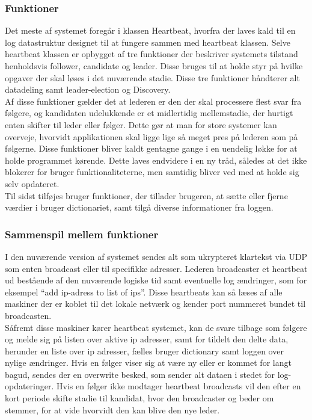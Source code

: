 \documentclass[a4paper,12pt]{article}
\begin{document}
\subsubsection{Funktioner} 
Det meste af systemet foregår i klassen Heartbeat, hvorfra der laves kald til en log datastruktur designet til at fungere sammen med heartbeat klassen. Selve heartbeat klassen er opbygget af tre funktioner der beskriver systemets tilstand henholdsvis follower, candidate og leader. Disse bruges til at holde styr på hvilke opgaver der skal løses i det nuværende stadie. Disse tre funktioner håndterer alt datadeling samt leader-election og Discovery.
\\[5px]
Af disse funktioner gælder det at lederen er den der skal processere flest svar fra følgere, og kandidaten udelukkende er et midlertidig mellemstadie, der hurtigt enten skifter til leder eller følger. Dette gør at man for store systemer kan overveje, hvorvidt applikationen skal ligge lige så meget pres på lederen som på følgerne.
Disse funktioner bliver kaldt gentagne gange i en uendelig løkke for at holde programmet kørende. Dette laves endvidere i en ny tråd, således at det ikke blokerer for bruger funktionaliteterne, men samtidig bliver ved med at holde sig selv opdateret.
\\
Til sidst tilføjes bruger funktioner, der tillader brugeren, at sætte eller fjerne værdier i bruger dictionariet, samt tilgå diverse informationer fra loggen.

\subsubsection{Sammenspil mellem funktioner}
I den nuværende version af systemet sendes alt som ukrypteret klartekst via UDP som enten broadcast eller til specifikke adresser. Lederen broadcaster et heartbeat ud bestående af den nuværende logiske tid samt eventuelle log ændringer, som for eksempel “add ip-adress to list of ips”.  Disse heartbeats kan så læses af alle maskiner der er koblet til det lokale netværk og kender port nummeret bundet til broadcasten. 
\\
Såfremt disse maskiner kører heartbeat systemet, kan de svare tilbage som følgere og melde sig på listen over aktive ip adresser, samt for tildelt den delte data, herunder en liste over ip adresser, fælles bruger dictionary samt loggen over nylige ændringer. Hvis en følger viser sig at være ny eller er kommet for langt bagud, sendes der en overwrite besked, som sender alt dataen i stedet for log-opdateringer. Hvis en følger ikke modtager heartbeat broadcasts vil den efter en kort periode skifte stadie til kandidat, hvor den broadcaster og beder om stemmer, for at vide hvorvidt den kan blive den nye leder.
\end{document}
